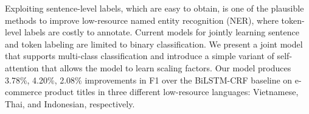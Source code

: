 Exploiting sentence-level labels, which are easy to obtain, is one of the plausible methods to improve low-resource named entity recognition (NER), where token-level labels are costly to annotate. Current models for jointly learning sentence and token labeling are limited to binary classification. We present a joint model that supports multi-class classification and introduce a simple variant of self-attention that allows the model to learn scaling factors. Our model produces 3.78\%, 4.20\%, 2.08\% improvements in F1 over the BiLSTM-CRF baseline on e-commerce product titles in three different low-resource languages: Vietnamese, Thai, and Indonesian, respectively.
